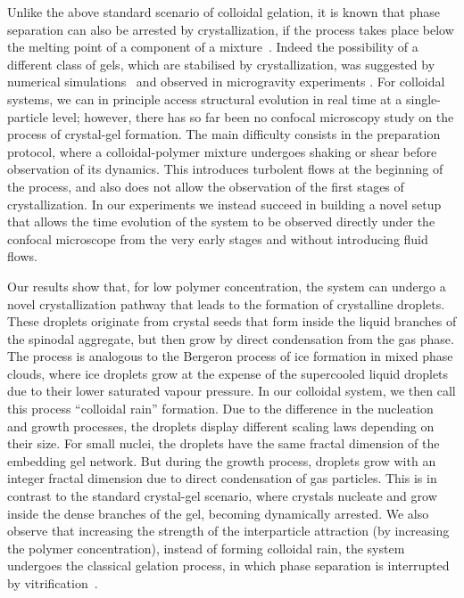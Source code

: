 \documentclass[twocolumn,showpacs,amsmath,amssymb,pre,superscriptaddress]{revtex4}
\begin{document}
Unlike the above standard scenario of colloidal gelation, it is known that phase separation can also be arrested by crystallization, if the process takes place below the melting point of a component of a mixture~\cite{tanaka1985new}. 
Indeed the possibility of a different class of gels, which are stabilised by crystallization, 
was suggested by numerical simulations~\cite{fortini2008crystallization,perez2011pathways} and observed in microgravity experiments \cite{sabin2012}.
For colloidal systems, we can in principle access structural evolution in real time at a single-particle level; however, there has so far been no confocal microscopy  
study on the process of crystal-gel formation. The main difficulty consists in the preparation protocol, where a colloidal-polymer mixture undergoes
shaking or shear before observation of its dynamics. This introduces turbolent flows at the beginning of the process, and also does not allow the
observation of the first stages of crystallization.
In our experiments we instead succeed in building a novel setup that allows the time evolution of the system to be observed directly
under the confocal microscope from the very early stages and without introducing fluid flows.

Our results show that, for low polymer concentration, the system can undergo a novel crystallization pathway that leads to the formation
of crystalline droplets. These droplets originate from crystal seeds that form inside the liquid branches of the spinodal aggregate, but then grow by direct condensation from the gas phase. The process is analogous to the Bergeron process of ice formation in mixed phase clouds, where ice droplets grow at the
expense of the supercooled liquid droplets due to their lower saturated vapour pressure. In our colloidal system, we then call this process ``colloidal rain''
formation. Due to the difference in the nucleation and growth processes, the droplets display different scaling laws depending on their
size. For small nuclei, the droplets have the same fractal dimension of the embedding gel network. But during the growth process, droplets
grow with an integer fractal dimension due to direct condensation of gas particles. This is in contrast to the standard crystal-gel scenario, where crystals nucleate and grow inside the dense branches of the gel, becoming dynamically arrested. We also observe that increasing the strength of the interparticle attraction
(by increasing the polymer concentration), instead of forming colloidal rain, the system undergoes the classical gelation process, in which
phase separation is interrupted by vitrification~\cite{lu2008gelation}.
\end{document}
